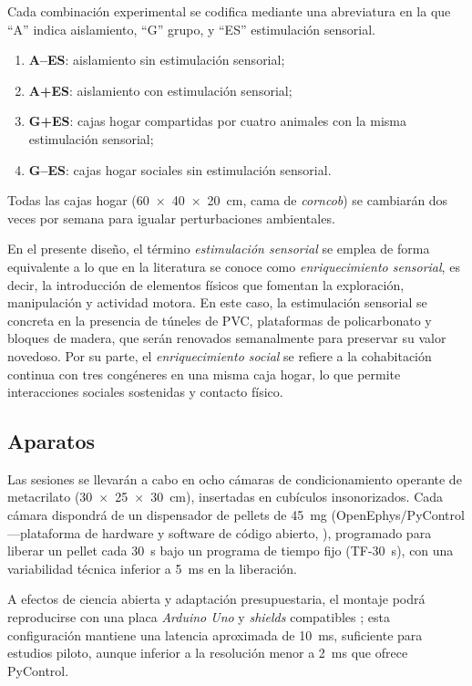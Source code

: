 \documentclass[12pt,a4paper]{article}
\begin{document}
\begin{multicols}{2}
Cada combinación experimental se codifica mediante una abreviatura en la que “A” indica aislamiento, “G” grupo, y “ES” estimulación sensorial.

\begin{enumerate}
    \item \textbf{A--ES}: aislamiento sin estimulación sensorial;
    \item \textbf{A+ES}: aislamiento con estimulación sensorial;
    \item \textbf{G+ES}: cajas hogar compartidas por cuatro animales con la misma estimulación sensorial;
    \item \textbf{G--ES}: cajas hogar sociales sin estimulación sensorial.
\end{enumerate}

Todas las cajas hogar (60~×~40~×~20~cm, cama de \textit{corncob}) se cambiarán dos veces por semana para igualar perturbaciones ambientales.

En el presente diseño, el término \textit{estimulación sensorial} se emplea de forma equivalente a lo que en la literatura se conoce como \textit{enriquecimiento sensorial}, es decir, la introducción de elementos físicos que fomentan la exploración, manipulación y actividad motora. En este caso, la estimulación sensorial se concreta en la presencia de túneles de PVC, plataformas de policarbonato y bloques de madera, que serán renovados semanalmente para preservar su valor novedoso. Por su parte, el \textit{enriquecimiento social} se refiere a la cohabitación continua con tres congéneres en una misma caja hogar, lo que permite interacciones sociales sostenidas y contacto físico.

\subsection*{Aparatos}

Las sesiones se llevarán a cabo en ocho cámaras de condicionamiento operante de metacrilato (30~×~25~×~30~cm), insertadas en cubículos insonorizados. Cada cámara dispondrá de un dispensador de pellets de 45~mg (OpenEphys/PyControl —plataforma de hardware y software de código abierto, \citep{PelletDispenserGitHub}), programado para liberar un pellet cada 30~s bajo un programa de tiempo fijo (TF-30~s), con una variabilidad técnica inferior a 5~ms en la liberación.


A efectos de ciencia abierta y adaptación presupuestaria, el montaje podrá reproducirse con una placa \textit{Arduino Uno} y \textit{shields} compatibles \citep{Arduino2024}; esta configuración mantiene una latencia aproximada de 10~ms, suficiente para estudios piloto, aunque inferior a la resolución menor a 2~ms que ofrece PyControl.


\end{multicols}
\end{document}
